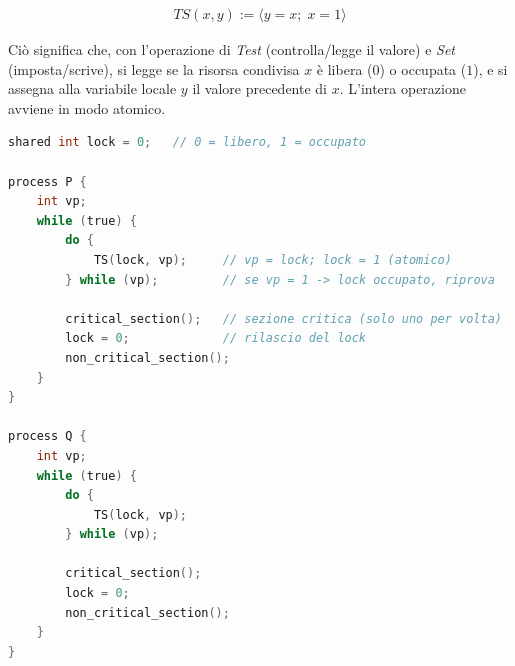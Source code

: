 \documentclass[a4paper,12pt]{article}
\begin{document}
\begin{align*}
  TS(x, y) := \langle y = x;\; x = 1 \rangle
\end{align*}

Ciò significa che, con l'operazione di \textit{Test} (controlla/legge il valore) e \textit{Set} (imposta/scrive), si legge se la risorsa condivisa $x$ è libera ($0$) o occupata ($1$), e si assegna alla variabile locale $y$ il valore precedente di $x$. L'intera operazione avviene in modo atomico.
\begin{lstlisting}[language=C]
shared int lock = 0;   // 0 = libero, 1 = occupato

process P {
    int vp;
    while (true) {
        do {
            TS(lock, vp);     // vp = lock; lock = 1 (atomico)
        } while (vp);         // se vp = 1 -> lock occupato, riprova

        critical_section();   // sezione critica (solo uno per volta)
        lock = 0;             // rilascio del lock
        non_critical_section();
    }
}

process Q {
    int vp;
    while (true) {
        do {
            TS(lock, vp);
        } while (vp);

        critical_section();
        lock = 0;
        non_critical_section();
    }
}
\end{lstlisting}
\vspace{20em}
\end{document}
